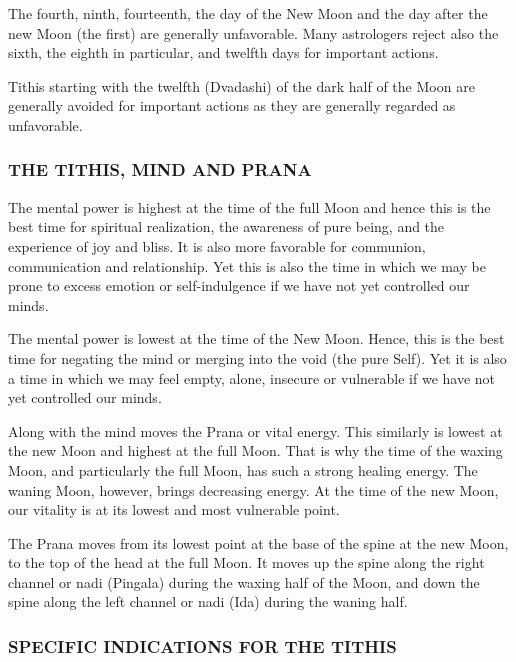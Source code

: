 The fourth, ninth, fourteenth, the day of the New Moon and the day after the new Moon (the first) are generally unfavorable. Many astrologers reject also the sixth, the eighth in particular, and twelfth days for important actions.

 

Tithis starting with the twelfth (Dvadashi) of the dark half of the Moon are generally avoided for important actions as they are generally regarded as unfavorable.

 

\subsubsection{THE TITHIS, MIND AND PRANA}

The mental power is highest at the time of the full Moon and hence this is the best time for spiritual realization, the awareness of pure being, and the experience of joy and bliss. It is also more favorable for communion, communication and relationship. Yet this is also the time in which we may be prone to excess emotion or self-indulgence if we have not yet controlled our minds.

 

The mental power is lowest at the time of the New Moon. Hence, this is the best time for negating the mind or merging into the void (the pure Self). Yet it is also a time in which we may feel empty, alone, insecure or vulnerable if we have not yet controlled our minds.

 

Along with the mind moves the Prana or vital energy. This similarly is lowest at the new Moon and highest at the full Moon. That is why the time of the waxing Moon, and particularly the full Moon, has such a strong healing energy. The waning Moon, however, brings decreasing energy. At the time of the new Moon, our vitality is at its lowest and most vulnerable point.

 

The Prana moves from its lowest point at the base of the spine at the new Moon, to the top of the head at the full Moon. It moves up the spine along the right channel or nadi (Pingala) during the waxing half of the Moon, and down the spine along the left channel or nadi (Ida) during the waning half.

 

\subsubsection{SPECIFIC INDICATIONS FOR THE TITHIS}

